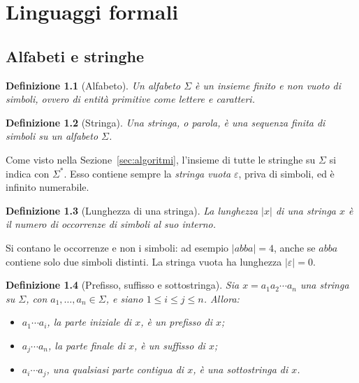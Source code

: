 \documentclass[a4paper, 11pt, oneside]{book}
\theoremstyle{formale}
\newtheorem*{definition}{Definizione}
\begin{document}
    \chapter{Linguaggi formali}
    \section{Alfabeti e stringhe}
    \begin{definition}[Alfabeto]
        Un \emph{alfabeto} $\Sigma$ \`e un insieme finito e non vuoto di simboli, ovvero di
        entit\`a primitive come lettere e caratteri.
    \end{definition}

    \begin{definition}[Stringa]
        Una \emph{stringa}, o \emph{parola}, \`e una sequenza finita di simboli su un
        alfabeto $\Sigma$.
    \end{definition}

    Come visto nella Sezione~\ref{sec:algoritmi}, l'insieme di tutte le stringhe su
    $\Sigma$ si indica con $\Sigma^*$. Esso contiene sempre la \emph{stringa vuota}
    $\varepsilon$, priva di simboli, ed \`e infinito numerabile.

    \begin{definition}[Lunghezza di una stringa]
        La \emph{lunghezza} $|x|$ di una stringa $x$ \`e il numero di \emph{occorrenze} di
        simboli al suo interno.
    \end{definition}

    Si contano le occorrenze e non i simboli: ad esempio $|abba| = 4$, anche se $abba$
    contiene solo due simboli distinti. La stringa vuota ha lunghezza $|\varepsilon| = 0$.

    \begin{definition}[Prefisso, suffisso e sottostringa]
        Sia $x = a_1 a_2 \cdots a_n$ una stringa su $\Sigma$, con $a_1, \dots, a_n \in \Sigma$,
        e siano $1 \leq i \leq j \leq n$. Allora:
        \begin{itemize}
            \item $a_1 \cdots a_i$, la parte iniziale di $x$, \`e un \emph{prefisso} di $x$;
            \item $a_j \cdots a_n$, la parte finale di $x$, \`e un \emph{suffisso} di $x$;
            \item $a_i \cdots a_j$, una qualsiasi parte contigua di $x$, \`e una
                \emph{sottostringa} di $x$.
        \end{itemize}
    \end{definition}
\end{document}
